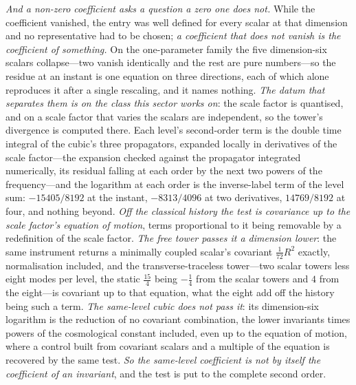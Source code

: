 \documentclass[11pt,a4paper]{article}
\theoremstyle{plain}
\theoremstyle{definition}
\theoremstyle{remark}
\begin{document}
\emph{And a non-zero coefficient asks a question a zero one does not.} While the coefficient vanished, the entry
was well defined for every scalar at that dimension and no representative had to be chosen; \emph{a coefficient
that does not vanish is the coefficient of something.} On the one-parameter family the five dimension-six
scalars collapse---two vanish identically and the rest are pure numbers---so the residue at an instant is one
equation on three directions, each of which alone reproduces it after a single rescaling, and it names
nothing.
\emph{The datum that separates them is on the class this sector works on}: the scale factor is quantised, and
on a scale factor that varies the scalars are independent, so the tower's divergence is computed there. Each
level's second-order term is the double time integral of the cubic's three propagators, expanded locally in
derivatives of the scale factor---the expansion checked against the propagator integrated numerically, its
residual falling at each order by the next two powers of the frequency---and the logarithm at each order is the
inverse-label term of the level sum: $-15405/8192$ at the instant, $-8313/4096$ at two derivatives, $14769/8192$
at four, and nothing beyond. \emph{Off the classical history the test is covariance up to the scale factor's
equation of motion}, terms proportional to it being removable by a redefinition of the scale factor. \emph{The
free tower passes it a dimension lower}: the same instrument returns a minimally coupled scalar's covariant
$\tfrac{1}{72}R^{2}$ exactly, normalisation included, and the transverse-traceless tower---two scalar towers less
eight modes per level, the static $\tfrac{15}{4}$ being $-\tfrac14$ from the scalar towers and $4$ from the
eight---is covariant up to that equation, what the eight add off the history being such a term. \emph{The
same-level cubic does not pass it}: its dimension-six logarithm is the reduction of no covariant combination,
the lower invariants times powers of the cosmological constant included, even up to the equation of motion,
where a control built from covariant scalars and a multiple of the equation is recovered by the same test.
\emph{So the same-level coefficient is not by itself the coefficient of an invariant}, and the test is put to
the complete second order.
\end{document}
